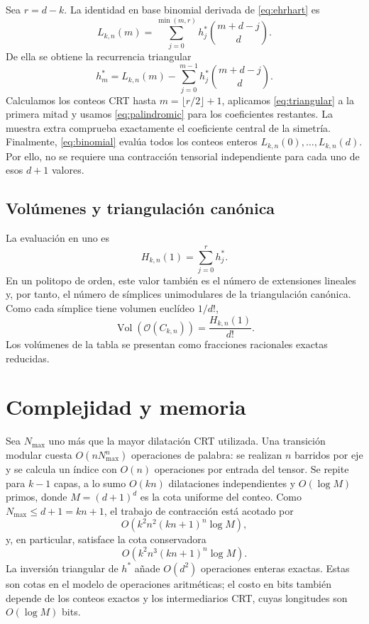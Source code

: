 \documentclass[11pt,a4paper]{article}
\newcommand{\Ocal}{\mathcal{O}}
\newcommand{\Vol}{\operatorname{Vol}}
\begin{document}
Sea $r=d-k$. La identidad en base binomial derivada de
\eqref{eq:ehrhart} es
\begin{equation}
  L_{k,n}(m)=\sum_{j=0}^{\min(m,r)}
    h_j^*\binom{m+d-j}{d}.
  \label{eq:binomial}
\end{equation}
De ella se obtiene la recurrencia triangular
\begin{equation}
  h_m^*=L_{k,n}(m)-
  \sum_{j=0}^{m-1}h_j^*\binom{m+d-j}{d}.
  \label{eq:triangular}
\end{equation}
Calculamos los conteos CRT hasta $m=\lfloor r/2\rfloor+1$, aplicamos
\eqref{eq:triangular} a la primera mitad y usamos
\eqref{eq:palindromic} para los coeficientes restantes. La muestra extra
comprueba exactamente el coeficiente central de la simetría. Finalmente,
\eqref{eq:binomial} evalúa todos los conteos enteros
$L_{k,n}(0),\ldots,L_{k,n}(d)$. Por ello, no se requiere una contracción
tensorial independiente para cada uno de esos $d+1$ valores.

\subsection{Volúmenes y triangulación canónica}

La evaluación en uno es
\[
  H_{k,n}(1)=\sum_{j=0}^{r}h_j^*.
\]
En un politopo de orden, este valor también es el número de extensiones
lineales y, por tanto, el número de símplices unimodulares de la
triangulación canónica. Como cada símplice tiene volumen euclídeo $1/d!$,
\begin{equation}
  \Vol(\Ocal(C_{k,n}))=\frac{H_{k,n}(1)}{d!}.
  \label{eq:volume}
\end{equation}
Los volúmenes de la tabla se presentan como fracciones racionales exactas
reducidas.

\section{Complejidad y memoria}

Sea $N_{\max}$ uno más que la mayor dilatación CRT utilizada. Una
transición modular cuesta $O(nN_{\max}^n)$ operaciones de palabra: se
realizan $n$ barridos por eje y se calcula un índice con $O(n)$ operaciones
por entrada del tensor. Se repite para $k-1$ capas, a lo sumo $O(kn)$
dilataciones independientes y $O(\log M)$ primos, donde $M=(d+1)^d$ es la
cota uniforme del conteo. Como $N_{\max}\leq d+1=kn+1$, el trabajo de
contracción está acotado por
\[
  O\!\left(k^2n^2(kn+1)^n\log M\right),
\]
y, en particular, satisface la cota conservadora
\begin{equation}
  O\!\left(k^2n^3(kn+1)^n\log M\right).
  \label{eq:complexity}
\end{equation}
La inversión triangular de $h^*$ añade $O(d^2)$ operaciones enteras
exactas. Estas son cotas en el modelo de operaciones aritméticas; el costo
en bits también depende de los conteos exactos y los intermediarios CRT,
cuyas longitudes son $O(\log M)$ bits.
\end{document}
